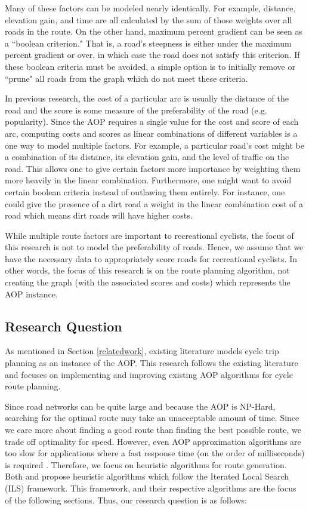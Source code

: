 \documentclass[honors]{union-cs-thesis}
\begin{document}
Many of these factors can be modeled nearly identically. For example, distance, elevation gain, and time are all calculated by the sum of those weights over all roads in the route. On the other hand, maximum percent gradient can be seen as a ``boolean criterion." That is, a road's steepness is either under the maximum percent gradient or over, in which case the road does not satisfy this criterion. If these boolean criteria must be avoided, a simple option is to initially remove or ``prune" all roads from the graph which do not meet these criteria.

In previous research, the cost of a particular arc is usually the distance of the  road and the score is some measure of the preferability of the road (e.g. popularity). Since the AOP requires a single value for the cost and score of each arc, computing costs and scores as linear combinations of different variables is a one way to model multiple factors. For example, a particular road's cost might be a combination of its distance, its elevation gain, and the level of traffic on the road. This allows one to give certain factors more importance by weighting them more heavily in the linear combination. Furthermore, one might want to avoid certain boolean criteria instead of outlawing them entirely. For instance, one could give the presence of a dirt road a  weight in the linear combination cost of a road which means dirt roads will have higher costs.

While multiple route factors are important to recreational cyclists, the focus of this research is not to model the preferability of roads. Hence, we assume that we have the necessary data to appropriately score roads for recreational cyclists. In other words, the focus of this research is on the route planning algorithm, not creating the graph (with the associated scores and costs) which represents the AOP instance.


\subsection{Research Question}
As mentioned in Section \ref{relatedwork}, existing literature models cycle trip planning as an instance of the AOP. This research follows the existing literature and focuses on implementing and improving existing AOP algorithms for cycle route planning. 

Since road networks can be quite large and because the AOP is NP-Hard, searching for the optimal route may take an unacceptable amount of time. Since we care more about finding a good route than finding the best possible route, we trade off optimality for speed. However, even AOP approximation algorithms are too slow for applications where a fast response time (on the order of milliseconds) is required \cite{lu2015arc}. Therefore, we focus on heuristic algorithms for route generation. Both \citeauthor{verbeeck2014extension} and \citeauthor{lu2015arc} propose heuristic algorithms which follow the Iterated Local Search (ILS) framework. This framework, and their respective algorithms are the focus of the following sections. Thus, our research question is as follows:
\end{document}
